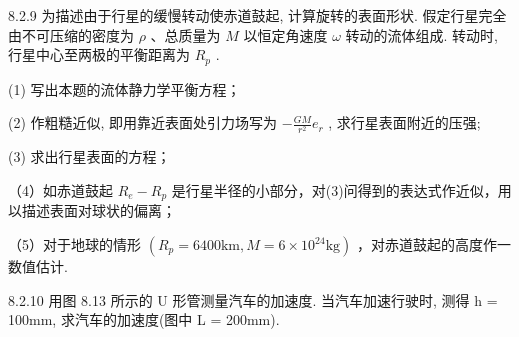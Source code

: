 \begin{problem}{8.2.9}
为描述由于行星的缓慢转动使赤道鼓起, 计算旋转的表面形状. 假定行星完全由不可压缩的密度为 $\rho$ 、总质量为 $M$ 以恒定角速度 $\omega$ 转动的流体组成. 转动时, 行星中心至两极的平衡距离为 $R_{p}$ .

(1) 写出本题的流体静力学平衡方程；

(2) 作粗糙近似, 即用靠近表面处引力场写为 $-\frac{GM}{r^2} e_r$ , 求行星表面附近的压强;

(3) 求出行星表面的方程；

（4）如赤道鼓起 $R_{e} - R_{p}$ 是行星半径的小部分，对(3)问得到的表达式作近似，用以描述表面对球状的偏离；

（5）对于地球的情形 $(R_{p}=6400\mathrm{km},M=6\times10^{24}\mathrm{kg})$ ，对赤道鼓起的高度作一数值估计.
\end{problem}
\clearpage


\begin{problem}{8.2.10}
用图 8.13 所示的 U 形管测量汽车的加速度. 当汽车加速行驶时, 测得 h = 100mm, 求汽车的加速度(图中 L = 200mm).
\begin{center}

\end{center}
\end{problem}
\clearpage


